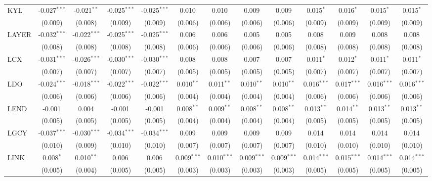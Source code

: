 \begin{table}[!htbp]
\begin{tabular}{@{\extracolsep{5pt}}lcccccccccccc}
 KYL & -0.027$^{***}$ & -0.021$^{**}$ & -0.025$^{***}$ & -0.025$^{***}$ & 0.010$^{}$ & 0.010$^{}$ & 0.009$^{}$ & 0.009$^{}$ & 0.015$^{*}$ & 0.016$^{*}$ & 0.015$^{*}$ & 0.015$^{*}$ \\
  & (0.009) & (0.008) & (0.009) & (0.009) & (0.006) & (0.006) & (0.006) & (0.006) & (0.009) & (0.009) & (0.009) & (0.009) \\
 LAYER & -0.032$^{***}$ & -0.022$^{***}$ & -0.025$^{***}$ & -0.025$^{***}$ & 0.006$^{}$ & 0.006$^{}$ & 0.005$^{}$ & 0.005$^{}$ & 0.008$^{}$ & 0.009$^{}$ & 0.008$^{}$ & 0.008$^{}$ \\
  & (0.008) & (0.008) & (0.008) & (0.008) & (0.006) & (0.006) & (0.006) & (0.006) & (0.008) & (0.008) & (0.008) & (0.008) \\
 LCX & -0.031$^{***}$ & -0.026$^{***}$ & -0.030$^{***}$ & -0.030$^{***}$ & 0.008$^{}$ & 0.008$^{}$ & 0.007$^{}$ & 0.007$^{}$ & 0.011$^{*}$ & 0.012$^{*}$ & 0.011$^{*}$ & 0.011$^{*}$ \\
  & (0.007) & (0.007) & (0.007) & (0.007) & (0.005) & (0.005) & (0.005) & (0.005) & (0.007) & (0.007) & (0.007) & (0.007) \\
 LDO & -0.024$^{***}$ & -0.018$^{***}$ & -0.022$^{***}$ & -0.022$^{***}$ & 0.010$^{**}$ & 0.011$^{**}$ & 0.010$^{**}$ & 0.010$^{**}$ & 0.016$^{***}$ & 0.017$^{***}$ & 0.016$^{***}$ & 0.016$^{***}$ \\
  & (0.006) & (0.006) & (0.006) & (0.006) & (0.004) & (0.004) & (0.004) & (0.004) & (0.006) & (0.006) & (0.006) & (0.006) \\
 LEND & -0.001$^{}$ & 0.004$^{}$ & -0.001$^{}$ & -0.001$^{}$ & 0.008$^{**}$ & 0.009$^{**}$ & 0.008$^{**}$ & 0.008$^{**}$ & 0.013$^{**}$ & 0.014$^{**}$ & 0.013$^{**}$ & 0.013$^{**}$ \\
  & (0.005) & (0.005) & (0.005) & (0.005) & (0.004) & (0.004) & (0.004) & (0.004) & (0.005) & (0.005) & (0.005) & (0.005) \\
 LGCY & -0.037$^{***}$ & -0.030$^{***}$ & -0.034$^{***}$ & -0.034$^{***}$ & 0.009$^{}$ & 0.009$^{}$ & 0.009$^{}$ & 0.009$^{}$ & 0.014$^{}$ & 0.014$^{}$ & 0.014$^{}$ & 0.014$^{}$ \\
  & (0.010) & (0.009) & (0.010) & (0.010) & (0.007) & (0.007) & (0.007) & (0.007) & (0.010) & (0.010) & (0.010) & (0.010) \\
 LINK & 0.008$^{*}$ & 0.010$^{**}$ & 0.006$^{}$ & 0.006$^{}$ & 0.009$^{***}$ & 0.010$^{***}$ & 0.009$^{***}$ & 0.009$^{***}$ & 0.014$^{***}$ & 0.015$^{***}$ & 0.014$^{***}$ & 0.014$^{***}$ \\
  & (0.005) & (0.004) & (0.005) & (0.005) & (0.003) & (0.003) & (0.003) & (0.003) & (0.005) & (0.005) & (0.005) & (0.005) \\

\end{tabular}
\end{table}
